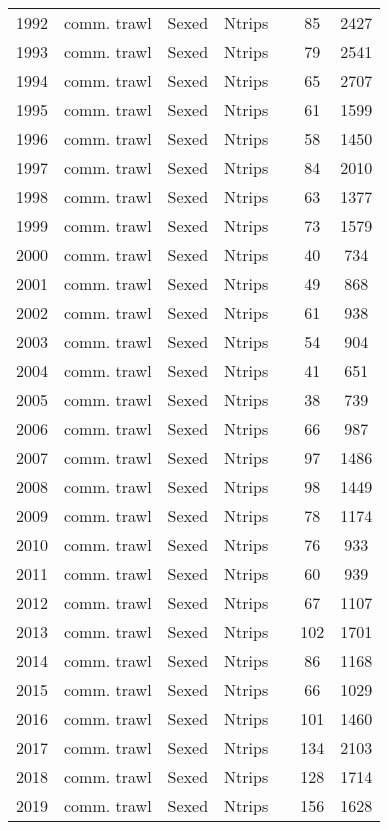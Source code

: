\begin{longtable}[t]{c>{\centering\arraybackslash}p{3cm}ccccc}
1992 & comm. trawl & Sexed & Ntrips &  & 85 & 2427\\
1993 & comm. trawl & Sexed & Ntrips &  & 79 & 2541\\
1994 & comm. trawl & Sexed & Ntrips &  & 65 & 2707\\
1995 & comm. trawl & Sexed & Ntrips &  & 61 & 1599\\
1996 & comm. trawl & Sexed & Ntrips &  & 58 & 1450\\
1997 & comm. trawl & Sexed & Ntrips &  & 84 & 2010\\
1998 & comm. trawl & Sexed & Ntrips &  & 63 & 1377\\
1999 & comm. trawl & Sexed & Ntrips &  & 73 & 1579\\
2000 & comm. trawl & Sexed & Ntrips &  & 40 & 734\\
2001 & comm. trawl & Sexed & Ntrips &  & 49 & 868\\
2002 & comm. trawl & Sexed & Ntrips &  & 61 & 938\\
2003 & comm. trawl & Sexed & Ntrips &  & 54 & 904\\
2004 & comm. trawl & Sexed & Ntrips &  & 41 & 651\\
2005 & comm. trawl & Sexed & Ntrips &  & 38 & 739\\
2006 & comm. trawl & Sexed & Ntrips &  & 66 & 987\\
2007 & comm. trawl & Sexed & Ntrips &  & 97 & 1486\\
2008 & comm. trawl & Sexed & Ntrips &  & 98 & 1449\\
2009 & comm. trawl & Sexed & Ntrips &  & 78 & 1174\\
2010 & comm. trawl & Sexed & Ntrips &  & 76 & 933\\
2011 & comm. trawl & Sexed & Ntrips &  & 60 & 939\\
2012 & comm. trawl & Sexed & Ntrips &  & 67 & 1107\\
2013 & comm. trawl & Sexed & Ntrips &  & 102 & 1701\\
2014 & comm. trawl & Sexed & Ntrips &  & 86 & 1168\\
2015 & comm. trawl & Sexed & Ntrips &  & 66 & 1029\\
2016 & comm. trawl & Sexed & Ntrips &  & 101 & 1460\\
2017 & comm. trawl & Sexed & Ntrips &  & 134 & 2103\\
2018 & comm. trawl & Sexed & Ntrips &  & 128 & 1714\\
2019 & comm. trawl & Sexed & Ntrips &  & 156 & 1628\\

\end{longtable}
